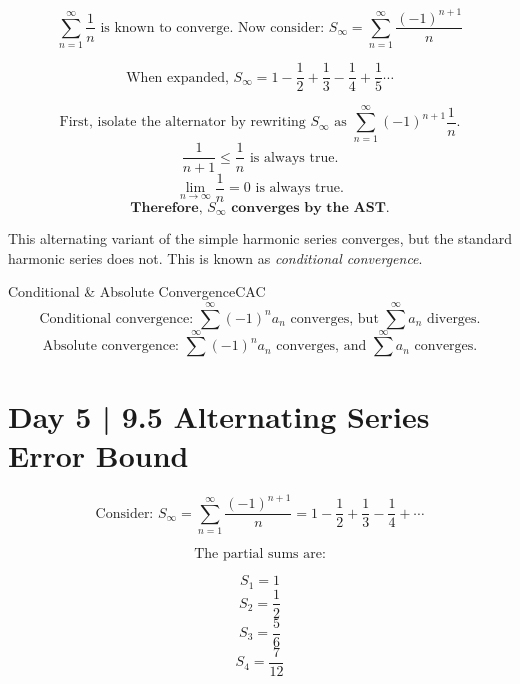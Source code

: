 \documentclass{article}
\theoremstyle{definition}
\begin{document}
\[\sum_{n=1}^{\infty} \frac{1}{n} \text{ is known to converge. Now consider: } S_\infty=\sum_{n=1}^{\infty} \frac{(-1)^{n+1}}{n}\]

\[\text{When expanded, } S_\infty=1-\frac{1}{2}+\frac{1}{3}-\frac{1}{4}+\frac{1}{5} \cdots \]

\[\text{First, isolate the alternator by rewriting $S_\infty$ as } \sum_{n=1}^{\infty} (-1)^{n+1}\frac{1}{n}.\]
\[\frac{1}{n+1} \le \frac{1}{n} \text{ is always true.}\]
\[\lim_{n \to \infty} \frac{1}{n}=0 \text{ is always true.}\]
\[\textbf{Therefore, $S_\infty$ converges by the AST.}\]

\vspace{0.5cm}

This alternating variant of the simple harmonic series converges, but the standard harmonic series does not. This is known as \emph{conditional convergence}.

\begin{definition}{Conditional \& Absolute Convergence}{CAC}
\vspace{-0.5cm}
    \[\text{Conditional convergence: } \sum^{\infty} (-1)^n a_n \text{ converges, but } \sum^{\infty} a_n \text{ diverges.}\]
\vspace{-0.5cm}
    \[\text{Absolute convergence: } \sum^{\infty} (-1)^n a_n \text{ converges, and } \sum^{\infty} a_n \text{ converges.}\]
\end{definition}



\section{Day 5 | 9.5 Alternating Series Error Bound}

\vspace{0.5cm}

\[\text{Consider: } S_\infty = \sum_{n=1}^{\infty} \frac{(-1)^{n+1}}{n}=1-\frac{1}{2}+\frac{1}{3}-\frac{1}{4}+\cdots\]


\[\text{The partial sums are:}\]

\[S_1=1\]
\[S_2=\frac{1}{2}\]
\[S_3=\frac{5}{6}\]
\[S_4=\frac{7}{12}\]
\end{document}
